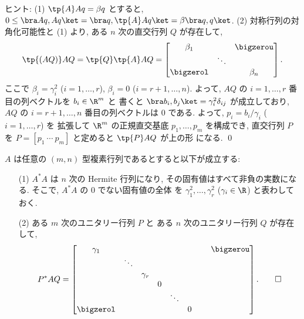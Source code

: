 \documentclass[12pt,twoside]{jarticle}
\begin{document}
\noindent
ヒント:  (1) $\tp{A}A q = \beta q$ とすると,
$0\le\bra Aq,Aq\ket=\bra q,\tp{A}Aq\ket=\beta\bra q,q\ket$. \quad
(2) 対称行列の対角化可能性と (1) より, ある $n$ 次の直交行列 $Q$ が存在して,
\begin{equation*}
  \tp{(AQ)}AQ =
  \tp{Q}\tp{A}AQ =
  \begin{bmatrix}
    \beta_1   &        & \bigzerou \\
              & \ddots &           \\
    \bigzerol &        & \beta_n   \\
  \end{bmatrix}.
\end{equation*}
ここで $\beta_i=\gamma_i^2$ ($i=1,\dots,r$), $\beta_i=0$ ($i=r+1,\dots,n$).
よって, $AQ$ の $i=1,\dots,r$ 番目の列ベクトルを $b_i\in\R^m$ と
書くと $\bra b_i,b_j\ket=\gamma_i^2 \delta_{ij}$ が成立しており, 
$AQ$ の $i=r+1,\dots,n$ 番目の列ベクトルは $0$ である.
よって, $p_i=b_i/\gamma_i$ ($i=1,\dots,r$) を
拡張して $\R^m$ の正規直交基底 $p_1,\dots,p_m$ を構成でき, 
直交行列 $P$ を $P=[p_1\ \cdots\ p_m]$ と定めると $\tp{P}AQ$ が上の形
になる. 
\qed


\begin{question}
\label{q:complex-PAQ}
  $A$ は任意の $(m,n)$ 型複素行列であるとすると以下が成立する:
  \begin{enumerate}
  \item[(1)] $A^*A$ は $n$ 次の Hermite 行列になり, 
    その固有値はすべて非負の実数になる.
    そこで, $A^*A$ の $0$ でない固有値の全体
    を $\gamma_1^2,\dots,\gamma_r^2$ ($\gamma_i\in\R$) と表わしておく.
  \item[(2)] ある $m$ 次のユニタリー行列 $P$ と
    ある $n$ 次のユニタリー行列 $Q$ が存在して, 
    \begin{equation*}
      P^*AQ = 
      \begin{bmatrix}
        \gamma_1  &        &          &   &        &   & \ & \bigzerou \\
                  & \ddots &          &   &        &   & & \\
                  &        & \gamma_r &   &        &   & & \\
                  &        &          & 0 &        &   & & \\
                  &        &          &   & \ddots &   & & \\
        \bigzerol &        &          &   &        & 0 & & \\
      \end{bmatrix}.
      \qed
    \end{equation*}
  \end{enumerate}
\end{question}
\end{document}
